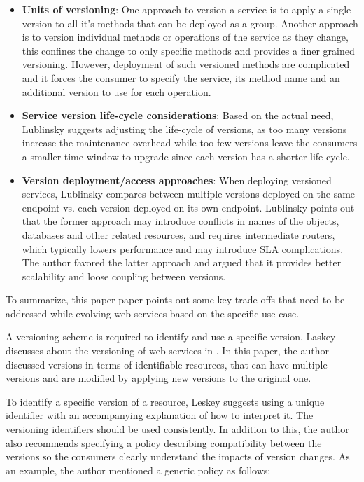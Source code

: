 \documentclass[runningheads,a4paper]{llncs}
\begin{document}
\begin{itemize}

  \item \textbf{Units of versioning}: One approach to version a service is to apply a single version to all it’s methods that can be deployed as a group. Another approach is to version individual methods or operations of the service as they change, this confines the change to only specific methods and provides a finer grained versioning. However, deployment of such versioned methods are complicated and it forces the consumer to specify the service, its method name and an additional version to use for each operation.
  \item \textbf{Service version life-cycle considerations}: Based on the actual need, Lublinsky suggests adjusting the life-cycle of versions, as too many versions increase the maintenance overhead while too few versions leave the consumers a smaller time window to upgrade since each version has a shorter life-cycle.
  \item \textbf{Version deployment/access approaches}: When deploying versioned services, Lublinsky compares between multiple versions deployed on the same endpoint vs. each version deployed on its own endpoint. Lublinsky points out that the former approach may introduce conflicts in names of the objects, databases and other related resources, and requires intermediate routers, which typically lowers performance and may introduce SLA complications. The author favored the latter approach and argued that it provides better scalability and loose coupling between versions.

\end{itemize}

To summarize, this paper paper points out some key trade-offs that need to be addressed while evolving web services based on the specific use case.

A versioning scheme is required to identify and use a specific version. Laskey discusses about the versioning of web services in \cite{laskey2008considerations}. In this paper, the author discussed versions in terms of identifiable resources, that can have multiple versions and are modified by applying new versions to the original one.

To identify a specific version of a resource, Leskey suggests using a unique identifier with an accompanying explanation of how to interpret it. The versioning identifiers should be used consistently. In addition to this, the author also recommends specifying a policy describing compatibility between the versions so the consumers clearly understand the impacts of version changes. As an example, the author mentioned a generic policy as follows:
\end{document}
